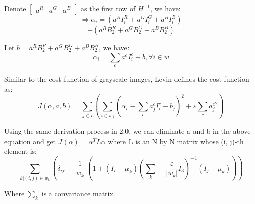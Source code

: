 \documentclass[11pt,letterpaper]{article}
\begin{document}
Denote $\begin{bmatrix} a^R & a^G & a^B \end{bmatrix}$ as the first row of $H^{-1}$, we have: 
$$\Rightarrow \alpha_i = 
(a^RI_i^R + a^GI_i^G + a^BI_i^B) $$
$$-(a^RB_2^R + a^GB_2^G + a^BB_2^B)$$

Let $b = a^RB_2^R + a^GB_2^G + a^BB_2^B$, we have:
$$\alpha_i = \sum_{c}a^cI_i^c + b, \forall i \in w$$

Similar to the cost function of gray­scale images, Levin defines the cost function as:
$$J(\alpha, a, b) = \sum_{j \in I}(\sum_{i \in w_j}(\alpha_i - \sum_c a_j^c I_i^c-b_j)^2+\varepsilon \sum_{c}{a_j^c}^2)$$

Using the same derivation process in 2.0, we can eliminate a and b in the above equation and get $J(\alpha) = \alpha^T L \alpha$ where L is an N by N matrix whose (i, j)-th element is:
$$\sum_{k|(i,j) \in w_k} (\delta_{ij} - \frac{1}{|w_k|}(1 + (I_i - \mu_k)(\sum_k + \frac{\varepsilon}{|w_k|}I_3)^{-1}(I_j - \mu_k)))$$

Where $\sum_k$ is a convariance matrix.
\end{document}
